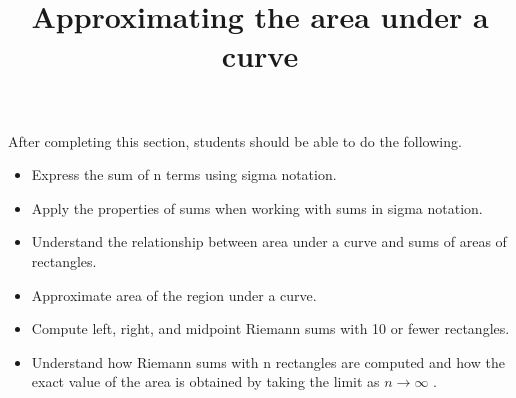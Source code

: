 \documentclass{ximera}
\title{Approximating the area under a curve}
\begin{document}
\begin{abstract}
\end{abstract}

\maketitle

\begin{sectionOutcomes}

After completing this section, students should be able to do the following.

\begin{itemize}
	\item Express the sum of n terms using sigma notation.
	\item Apply the properties of sums when working with sums in sigma notation.
	\item Understand the relationship between area under a curve and sums of areas of rectangles.
	\item Approximate area of the region under a curve.
	\item Compute left, right, and midpoint Riemann sums with 10 or fewer rectangles.
	\item Understand how Riemann sums with n rectangles are computed and how the exact value of the area is obtained by taking the limit as $n\to\infty$ .
\end{itemize}

\end{sectionOutcomes}
\end{document}
